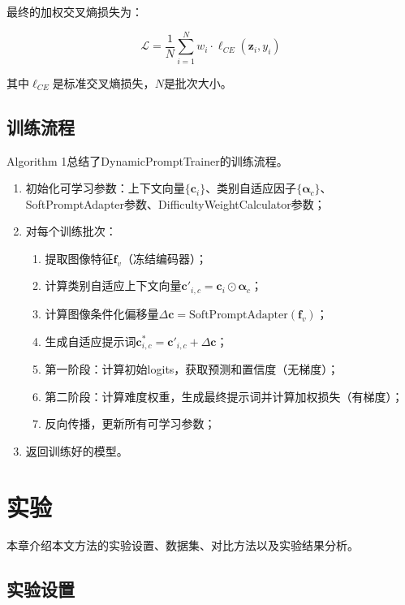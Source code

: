 \documentclass{HDU-Bachelor-Thesis}
\begin{document}
最终的加权交叉熵损失为：

\begin{equation}
\mathcal{L} = \frac{1}{N}\sum_{i=1}^{N} w_i \cdot \ell_{CE}(\mathbf{z}_i, y_i)
\end{equation}

其中$\ell_{CE}$是标准交叉熵损失，$N$是批次大小。

\subsection{训练流程}

Algorithm 1总结了DynamicPromptTrainer的训练流程。

\begin{enumerate}
\item 初始化可学习参数：上下文向量$\{\mathbf{c}_i\}$、类别自适应因子$\{\boldsymbol{\alpha}_c\}$、SoftPromptAdapter参数、DifficultyWeightCalculator参数；
\item 对每个训练批次：
  \begin{enumerate}
  \item 提取图像特征$\mathbf{f}_v$（冻结编码器）；
  \item 计算类别自适应上下文向量$\mathbf{c}'_{i,c} = \mathbf{c}_i \odot \boldsymbol{\alpha}_c$；
  \item 计算图像条件化偏移量$\Delta\mathbf{c} = \text{SoftPromptAdapter}(\mathbf{f}_v)$；
  \item 生成自适应提示词$\mathbf{c}^*_{i,c} = \mathbf{c}'_{i,c} + \Delta\mathbf{c}$；
  \item 第一阶段：计算初始logits，获取预测和置信度（无梯度）；
  \item 第二阶段：计算难度权重，生成最终提示词并计算加权损失（有梯度）；
  \item 反向传播，更新所有可学习参数；
  \end{enumerate}
\item 返回训练好的模型。
\end{enumerate}

\section{实验}

本章介绍本文方法的实验设置、数据集、对比方法以及实验结果分析。

\subsection{实验设置}
\end{document}
